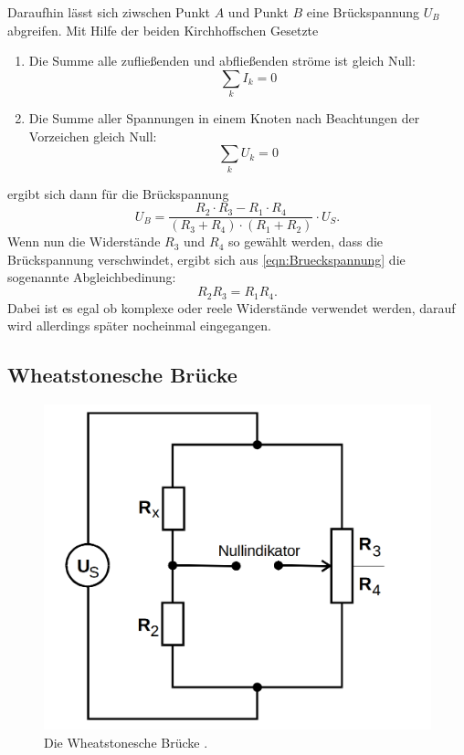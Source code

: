 Daraufhin lässt sich ziwschen Punkt $A$ und Punkt $B$ eine Brückspannung $U_B$ abgreifen.
Mit Hilfe der beiden Kirchhoffschen Gesetzte
\begin{enumerate}
\item Die Summe alle zufließenden und abfließenden ströme ist gleich Null:
\begin{equation}
\sum_k I_k = 0
\end{equation}
\item Die Summe aller Spannungen in einem Knoten nach Beachtungen der Vorzeichen gleich Null:
\begin{equation}
\sum_k U_k = 0
\end{equation}
\end{enumerate}
ergibt sich dann für die Brückspannung 
\begin{equation}
U_B = \frac{R_2\cdot R_3 - R_1 \cdot R_4}{(R_3 + R_4) \cdot (R_1 + R_2)} \cdot U_S .
\label{eqn:Brueckspannung}
\end{equation}
Wenn nun die Widerstände $R_3$ und $R_4$ so gewählt werden, dass die Brückspannung verschwindet,
ergibt sich aus \eqref{eqn:Brueckspannung} die sogenannte Abgleichbedinung:
\begin{equation}
R_2 R_3 = R_1 R_4 .
\label{eqn:abgleich}
\end{equation}
Dabei ist es egal ob komplexe oder reele Widerstände verwendet werden, darauf wird allerdings später nocheinmal eingegangen.

\subsection{Wheatstonesche Brücke}

\begin{figure}
    \centering
    \includegraphics[scale=0.25]{content/Wheatstonesche.png}
    \caption{Die Wheatstonesche Brücke \cite[S. 219]{anleitung}.}
    \label{fig:wheatstonesche}
\end{figure}

